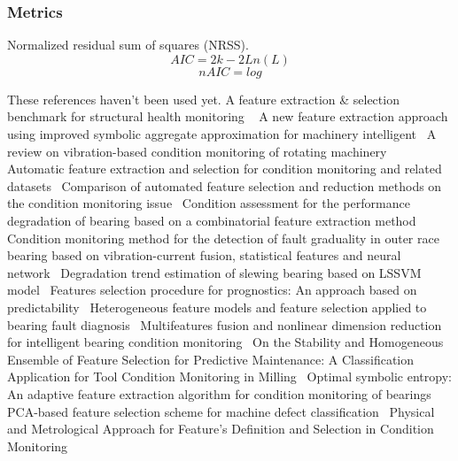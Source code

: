 \documentclass{article}
\begin{document}
\subsubsection{Metrics}
Normalized residual sum of squares (NRSS).
$$ AIC = 2k - 2Ln(L) $$  
$$ nAIC = log $$

These references haven't been used yet.
A feature extraction \& selection benchmark for structural health monitoring ~\cite{buckley2023feature}
A new feature extraction approach using improved symbolic aggregate approximation for machinery intelligent~\cite{zhang2019new}
A review on vibration-based condition monitoring of rotating machinery~\cite{tiboni2022review}
Automatic feature extraction and selection for condition monitoring and related datasets~\cite{schneider2018automatic}
Comparison of automated feature selection and reduction methods on the condition monitoring issue~\cite{de2018comparison}
Condition assessment for the performance degradation of bearing based on a combinatorial feature extraction method~\cite{hong2014condition}
Condition monitoring method for the detection of fault graduality in outer race bearing based on vibration-current fusion, statistical features and neural network~\cite{saucedo2021condition}
Degradation trend estimation of slewing bearing based on LSSVM model~\cite{lu2016degradation}
Features selection procedure for prognostics: An approach based on predictability~\cite{javed2012features}
Heterogeneous feature models and feature selection applied to bearing fault diagnosis~\cite{rauber2014heterogeneous}
Multifeatures fusion and nonlinear dimension reduction for intelligent bearing condition monitoring~\cite{guo2016multifeatures}
On the Stability and Homogeneous Ensemble of Feature Selection for Predictive Maintenance: A Classification Application for Tool Condition Monitoring in Milling~\cite{assafo2023stability}
Optimal symbolic entropy: An adaptive feature extraction algorithm for condition monitoring of bearings~\cite{li2023optimal}
PCA-based feature selection scheme for machine defect classification~\cite{malhi2004pca}
Physical and Metrological Approach for Feature’s Definition and Selection in Condition Monitoring~\cite{d2019physical}

\clearpage  
\end{document}
